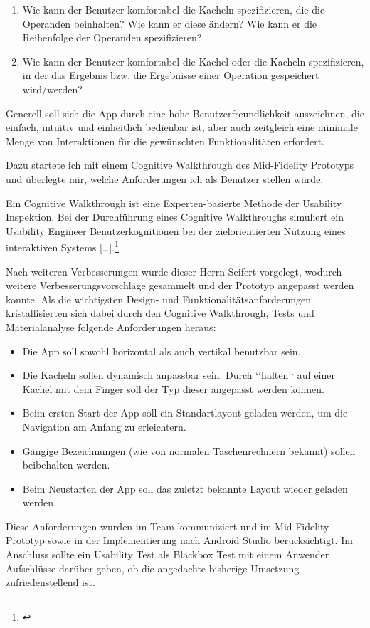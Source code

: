 \begin{enumerate}
	\item Wie kann der Benutzer komfortabel die Kacheln spezifizieren, die die Operanden beinhalten? Wie kann er diese ändern? Wie kann er die Reihenfolge der Operanden spezifizieren?
	\item Wie kann der Benutzer komfortabel die Kachel oder die Kacheln spezifizieren, in der das Ergebnis bzw. die Ergebnisse einer Operation gespeichert wird/werden?
\end{enumerate}

Generell soll sich die App durch eine hohe Benutzerfreundlichkeit auszeichnen, die einfach, intuitiv und einheitlich bedienbar ist, aber auch zeitgleich eine minimale Menge von Interaktionen für die gewünschten Funktionalitäten erfordert.

Dazu startete ich mit einem Cognitive Walkthrough des Mid-Fidelity Prototyps und überlegte mir, welche Anforderungen ich als Benutzer stellen würde. 

Ein Cognitive Walkthrough ist eine Experten-basierte Methode der Usability Inspektion. Bei der Durchführung eines Cognitive Walkthroughs simuliert ein Usability Engineer Benutzerkognitionen bei der zielorientierten Nutzung eines interaktiven Systems […].\footnote{\cite[][]{usabilityingermany}}

Nach weiteren Verbesserungen wurde dieser Herrn Seifert vorgelegt, wodurch weitere Verbesserungsvorschläge gesammelt und der Prototyp angepasst werden konnte. 
Als die wichtigsten Design- und Funktionalitätsanforderungen kristallisierten sich dabei durch den Cognitive Walkthrough, Tests und Materialanalyse folgende Anforderungen heraus:

\begin{itemize}
	\item Die App soll sowohl horizontal als auch vertikal benutzbar sein.
	\item Die Kacheln sollen dynamisch anpassbar sein: Durch ‘‘halten’‘ auf einer Kachel mit dem Finger soll der Typ dieser angepasst werden können.
	\item Beim ersten Start der App soll ein Standartlayout geladen werden, um die Navigation am Anfang zu erleichtern.
	\item Gängige Bezeichnungen (wie von normalen Taschenrechnern bekannt) sollen beibehalten werden.
	\item Beim Neustarten der App soll das zuletzt bekannte Layout wieder geladen werden.
\end{itemize}

Diese Anforderungen wurden im Team kommuniziert und im Mid-Fidelity Prototyp sowie in der Implementierung nach Android Studio berücksichtigt. Im Anschluss sollte ein Usability Test als Blackbox Test mit einem Anwender Aufschlüsse darüber geben, ob die angedachte bisherige Umsetzung zufriedenstellend ist.

